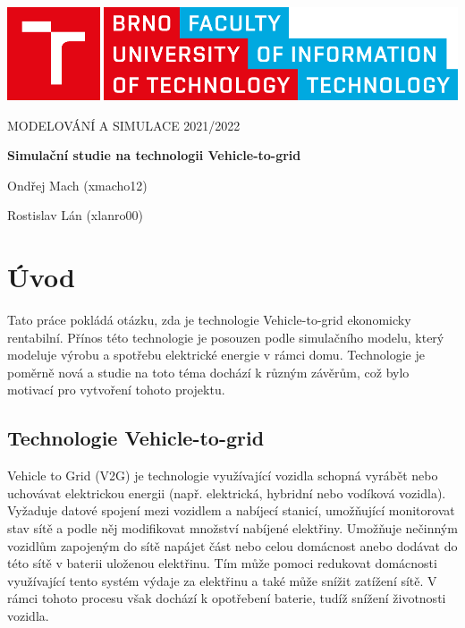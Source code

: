 \documentclass[12pt,a4paper]{article}
\begin{document}
\begin{titlepage}
\begin{center}
\includegraphics[width=0.5\linewidth]{img/logo.pdf}
\vspace{3cm}

\LARGE\uppercase{Modelování a simulace 2021/2022}
\vspace{1cm}

\LARGE\textbf{Simulační studie na technologii Vehicle-to-grid}

\vspace*{\fill}
\large{Ondřej Mach (xmacho12)}

\large{Rostislav Lán (xlanro00)}

\end{center}
\end{titlepage}


\setcounter{page}{1}
\tableofcontents
\clearpage


\section{Úvod}
Tato práce pokládá otázku, zda je technologie Vehicle-to-grid ekonomicky rentabilní.
Přínos této technologie je posouzen podle simulačního modelu, který modeluje výrobu a spotřebu elektrické energie v rámci domu.
Technologie je poměrně nová a studie na toto téma dochází k různým závěrům, což bylo motivací pro vytvoření tohoto projektu.

\subsection{Technologie Vehicle-to-grid}
Vehicle to Grid (V2G) je technologie využívající vozidla schopná vyrábět nebo uchovávat elektrickou energii (např. elektrická, hybridní nebo vodíková vozidla).
Vyžaduje datové spojení mezi vozidlem a nabíjecí stanicí, umožňující monitorovat stav sítě a podle něj modifikovat množství nabíjené elektřiny.
Umožňuje nečinným vozidlům zapojeným do sítě napájet část nebo celou domácnost anebo dodávat do této sítě v baterii uloženou elektřinu.
Tím může pomoci redukovat domácnosti využívající tento systém výdaje za elektřinu a také může snížit zatížení sítě.
V rámci tohoto procesu však dochází k opotřebení baterie, tudíž snížení životnosti vozidla.
\end{document}

